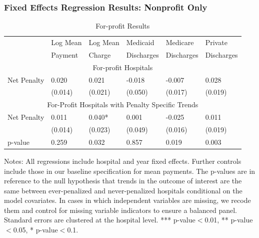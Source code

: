 \documentclass[ucs,9pt]{beamer}
\begin{document}
\begin{frame}
\frametitle{Fixed Effects Regression Results: Nonprofit Only}
\begin{table}[htp]
\centering \normalsize
\caption{For-profit Results}
\footnotesize
\begin{tabular}{llllll}
\hline	
\hline
 			& Log Mean				& Log Mean				& Medicaid 	   	& Medicare   		& Private  			\\
			& Payment		& Charge			& Discharges      		& Discharges       	& Discharges    \\
	\hline
\multicolumn{6}{c}{For-profit Hospitals}\\											
\hline											
Net Penalty 	&	0.020	&	0.021	&	-0.018	&	-0.007	&	0.028	\\
	&	(0.014)	&	(0.021)	&	(0.050)	&	(0.017)	&	(0.019)	\\
\hline											
\multicolumn{6}{c}{For-Profit Hospitals with Penalty Specific Trends} 											\\
\hline											
Net Penalty	&	0.011	&	0.040*	&	0.001	&	-0.025	&	0.011	\\
	&	(0.014)	&	(0.023)	&	(0.049)	&	(0.016)	&	(0.019)	\\
p-value & 0.259 & 0.032 & 0.857 & 0.019 & 0.003 \\
\hline
\end{tabular}
\end{table}
\tiny Notes: All regressions include hospital and year fixed effects.  Further controls include those in our baseline specification for mean payments.  The p-values are in reference to the null hypothesis that trends in the outcome of interest are the same between ever-penalized and never-penalized hospitals conditional on the model covariates.  In cases in which independent variables are missing, we recode them and control for missing variable indicators to ensure a balanced panel.  Standard errors are clustered at the hospital level.  *** p-value$<$0.01, ** p-value$<$0.05, * p-value$<$0.1.
\end{frame}
\end{document}
